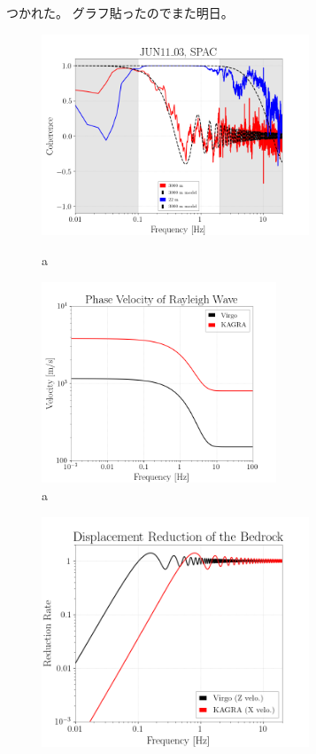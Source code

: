\documentclass[a4paper,12pt]{book}
\begin{document}
つかれた。
グラフ貼ったのでまた明日。

\begin{figure}[H]
 \begin{minipage}{0.5\hsize}
  \begin{center}
    \includegraphics[width=8.0cm]{./img_coherence_result.png}    
  \end{center}
  \caption{a}
  \label{img:img_coherence_result}  
 \end{minipage}
 \begin{minipage}{0.5\hsize}
  \begin{center}
    \includegraphics[width=7.0cm]{./img_RwaveVelocity.png}    
  \end{center}
  \caption{a}
  \label{img:img_RwaveVelocity}  
 \end{minipage}
\end{figure}

\begin{figure}[H]
  \begin{center}
    \includegraphics[width=8.0cm]{./img_CDMR.png}
  \end{center}
  \caption{}
  \label{img:img_dmrr}
\end{figure}



\appendix
%
\end{document}
